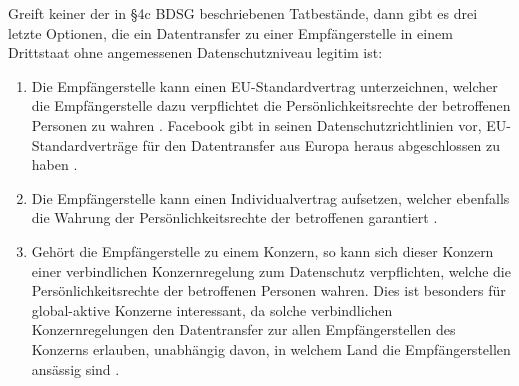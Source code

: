 \par
Greift keiner der in §4c BDSG beschriebenen Tatbestände, dann gibt es drei letzte Optionen, die ein Datentransfer zu einer Empfängerstelle in einem Drittstaat ohne angemessenen Datenschutzniveau legitim ist:
\begin{enumerate}
	\item Die Empfängerstelle kann einen EU-Standardvertrag unterzeichnen, welcher die Empfängerstelle dazu verpflichtet die Persönlichkeitsrechte der betroffenen Personen zu wahren \autocite[vgl.][]{LDI.2017}. Facebook gibt in seinen Datenschutzrichtlinien vor, EU-Standardverträge für den Datentransfer aus Europa heraus abgeschlossen zu haben \autocite[vgl.][]{FacebookInc..2017}.
	 
	\item Die Empfängerstelle kann einen Individualvertrag aufsetzen, welcher ebenfalls die Wahrung der Persönlichkeitsrechte der betroffenen garantiert \autocite[vgl.][]{LDI.2017}.
	
	\item Gehört die Empfängerstelle zu einem Konzern, so kann sich dieser Konzern einer verbindlichen Konzernregelung zum Datenschutz verpflichten, welche die Persönlichkeitsrechte der betroffenen Personen wahren. Dies ist besonders für global-aktive Konzerne interessant, da solche verbindlichen Konzernregelungen den Datentransfer zur allen Empfängerstellen des Konzerns erlauben, unabhängig davon, in welchem Land die Empfängerstellen ansässig sind \autocite[vgl.][]{LDI.2017}.
\end{enumerate}

